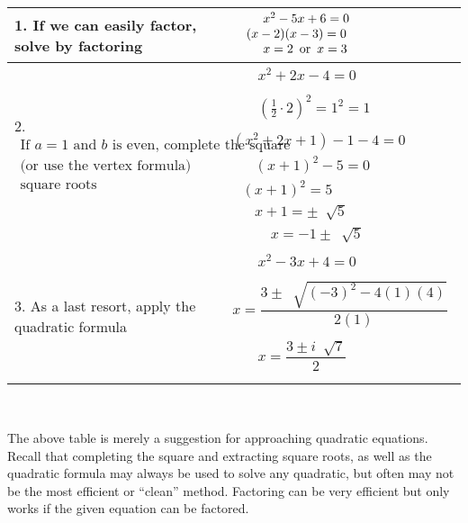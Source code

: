\begin{tabular}{|l|l|}
  \hline
  1. If we can easily factor, solve by factoring & $\begin{array}{l}
    ~~~~~~~x^2 - 5 x + 6 = 0\\
    ~~~(x - 2) (x - 3) = 0\\
    ~~~~~~~x = 2 \operatorname{~or~} x = 3
  \end{array}$\\
  \hline
  2.~$\begin{array}{l}
	\text{If~} a=1 \text{~and~} b \text{~is even, complete the square}\\
	\text{(or use the vertex formula) and extract}\\
	\text{square roots}
	\end{array}$ & $\begin{array}{l}
    ~~~~~~~~x^2 + 2 x - 4=0\\
    ~\\
		~~~~~~~~\left( \frac{1}{2} \cdot 2 \right)^2 = 1^2 = 1\\
    ~\\
		(x^2 + 2 x + 1) -1-4=0\\
    ~~~~~~~(x + 1)^2 - 5=0\\
    ~~~(x + 1)^2=5\\
    ~~~~~~~x + 1 = \pm~ \sqrt[]{5}\\
    ~~~~~~~~~~~~x = - 1 \pm~ \sqrt[]{5}
  \end{array}$\\
  \hline
  3. As a last resort, apply the quadratic formula & $\begin{array}{l}
    ~~~~~~~~x^2 - 3 x + 4 = 0\\
    ~\\
		x = \dfrac{3 \pm~ \sqrt[]{(- 3)^2 - 4 (1) (4)}}{2 (1)}\\
    ~\\
		~~~~~~~~x = \dfrac{3 \pm i~ \sqrt[]{7}}{2}\\
		~
  \end{array}$\\
  \hline
\end{tabular}
~\pp

The above table is merely a suggestion for approaching quadratic equations. %
Recall that completing the square and extracting square roots, as well as the quadratic formula may always
be used to solve any quadratic, but often may not be the most efficient or ``clean'' method. %
Factoring can be very efficient but only works if the given equation can be factored.
 






